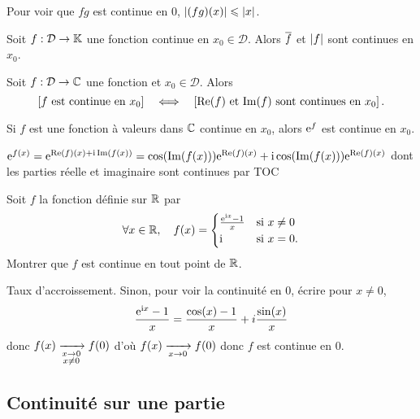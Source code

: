 \documentclass{magnolia}
\begin{document}
\begin{sol}
Pour voir que $fg$ est continue en $0$, $\left|(fg)(x)\right|\leqslant |x|$.
\end{sol}

\begin{proposition}[utile=-3]
Soit $f:\mathcal{D}\to\mathbb{K}$ une fonction continue en $x_0\in\mathcal{D}$. Alors $\overline{f}$ et $\left|f\right|$ sont
continues en $x_0$.  
\end{proposition}


\begin{proposition}[utile=-3]
Soit $f:\mathcal{D}\to\mathbb{C}$ une fonction et $x_0\in\mathcal{D}$. Alors
\[\left[\text{$f$ est continue en $x_0$}\right] \quad\Longleftrightarrow\quad
  \left[\text{$\mathop{\rm Re}(f)$ et $\mathop{\rm Im}(f)$ sont continues en $x_0$}\right].\]
\end{proposition}

\begin{remarqueUnique}
\remarque Si $f$ est une fonction à valeurs dans $\mathbb{C}$ continue en $x_0$, alors
  ${\rm e}^f$ est continue en $x_0$.
\end{remarqueUnique}
\begin{sol}
${\rm e}^{f(x)}={\rm e}^{\mathop{\rm Re}(f)(x)+{\rm i}\mathop{\rm Im}(f(x))}=\cos(\mathop{\rm Im}(f(x))){\rm e}^{\mathop{\rm Re}(f)(x)}+{\rm i}\cos(\mathop{\rm Im}(f(x))){\rm e}^{\mathop{\rm Re}(f)(x)}$ dont les parties réelle et imaginaire sont continues par TOC
\end{sol}

\begin{exos}
\exo Soit $f$ la fonction définie sur $\mathbb{R}$ par
  \[\forall x\in\mathbb{R} ,\quad f(x)=
    \begin{cases}
    \frac{{\rm e}^{{\rm i} x}-1}{x} & \text{si $x\neq 0$}\\
    {\rm i} & \text{si $x=0$.}
    \end{cases}\]
  Montrer que $f$ est continue en tout point de $\mathbb{R}$.
\end{exos}

\begin{sol}
Taux d'accroissement.
Sinon, pour voir la continuité en $0$, écrire pour $x\neq 0$, $$\frac{{\rm e}^{{\rm i} x}-1}{x}=\frac{\cos(x)-1}{x}+i\frac{\sin(x)}{x}$$ donc $f(x)\xrightarrow[ \substack{x\rightarrow 0 \\ x\not=0}]{}f(0)$ d'où $f(x)\xrightarrow[x\rightarrow 0]{}f(0)$ donc $f$ est continue en $0$.
\end{sol}




\subsection{Continuité sur une partie}
\end{document}
